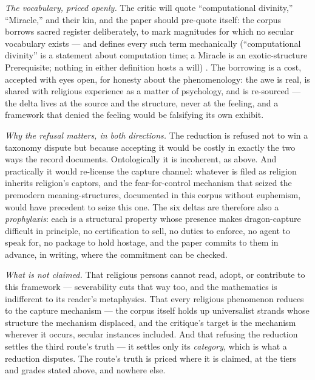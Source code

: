 \documentclass[11pt]{article}
\numberwithin{equation}{section}
\theoremstyle{plain}
\theoremstyle{definition}
\theoremstyle{remark}
\begin{document}
\emph{The vocabulary, priced openly.} The critic will quote
``computational divinity,'' ``Miracle,'' and their kin, and the
paper should pre-quote itself: the corpus borrows sacred register
deliberately, to mark magnitudes for which no secular vocabulary
exists --- and defines every such term mechanically
(``computational divinity'' is a statement about computation time;
a Miracle is an exotic-structure Prerequisite; nothing in either
definition hosts a will) \cite{Nexus}. The borrowing is a cost,
accepted with eyes open, for honesty about the phenomenology: the
awe is real, is shared with religious experience as a matter of
psychology, and is re-sourced --- the delta lives at the source and
the structure, never at the feeling, and a framework that denied the
feeling would be falsifying its own exhibit.

\emph{Why the refusal matters, in both directions.} The reduction is
refused not to win a taxonomy dispute but because accepting it would
be costly in exactly the two ways the record documents. Ontologically
it is incoherent, as above. And practically it would re-license the
capture channel: whatever is filed as religion inherits religion's
captors, and the fear-for-control mechanism that seized the
premodern meaning-structures, documented in this corpus without
euphemism, would have precedent to seize this one. The six deltas
are therefore also a \emph{prophylaxis}: each is a structural
property whose presence makes dragon-capture difficult in principle, no certification to sell, no duties to enforce, no agent to
speak for, no package to hold hostage, and the paper commits to
them in advance, in writing, where the commitment can be checked.

\emph{What is not claimed.} That religious persons cannot read,
adopt, or contribute to this framework --- severability cuts that
way too, and the mathematics is indifferent to its reader's
metaphysics. That every religious phenomenon reduces to the capture
mechanism --- the corpus itself holds up universalist strands whose
structure the mechanism displaced, and the critique's target is the
mechanism wherever it occurs, secular instances included. And that
refusing the reduction settles the third route's truth --- it
settles only its \emph{category}, which is what a reduction
disputes. The route's truth is priced where it is claimed, at the
tiers and grades stated above, and nowhere else.
\end{document}
